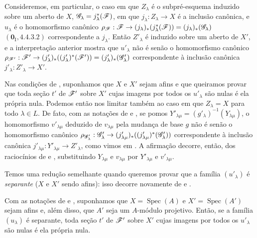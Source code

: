 \begin{env}[11.9.5]
Consideremos, em
particular, o caso em
que $Z_\lambda$ é o
subpré-esquema induzido
sobre um aberto de $X$,
$\mathscr{G}_\lambda=
j_\lambda^*(\mathscr{F})$,
em que $j_\lambda:
Z_\lambda\to X$ é a
inclusão canônica, e
$u_\lambda$ é o
homomorfismo canônico
$\rho_{\sh{F}}:
\sh{F}\to
(j_\lambda)_*
(j_\lambda^*(\sh{F}))
=(j_\lambda)_*
(\sh{G}_\lambda)$
$(\mathbf 0_{\mathrm I},
4.4.3.2)$ correspondente
a $j_\lambda$. Então
$Z'_\lambda$ é induzido
sobre um aberto de $X'$,
e a interpretação anterior
mostra que $u'_\lambda$
não é senão o
homomorfismo canônico
$\rho_{\sh{F}'}:
\sh{F}'\to
(j'_\lambda)_*
((j'_\lambda)^*
(\sh{F}'))
=(j'_\lambda)_*
(\sh{G}'_\lambda)$
correspondente à
inclusão canônica
$j'_\lambda:
Z'_\lambda\to X'$.
\end{env}

\begin{env}[11.9.6]
\label{IV.11.9.6}
Nas condições de
,
suponhamos que $X$ e
$X'$ sejam afins e que
queiramos provar que
toda seção $t'$ de
$\mathscr{F}'$ sobre $X'$
cujas imagens por todos
os $u'_\lambda$ são
nulas é ela própria
nula. Podemos então
nos limitar também ao
caso em que
$Z_\lambda=X$ para
todo $\lambda\in L$.
De fato, com as notações
de 
e ,
se pomos
$Y'_{\lambda\mu}
=(g'_\lambda)^{-1}
(Y_{\lambda\mu})$,
o homomorfismo
$v'_{\lambda\mu}$
deduzido de
$v_{\lambda\mu}$ pela
mudança de base $g$
não é senão o
homomorfismo canônico
$\rho_{\sh{G}'_\lambda}:
\sh{G}'_\lambda\to
(j'_{\lambda\mu})_*
((j'_{\lambda\mu})^*
(\sh{G}'_\lambda))$
correspondente à
inclusão canônica
$j'_{\lambda\mu}:
Y'_{\lambda\mu}\to
Z'_\lambda$, como vimos
em .
A afirmação decorre,
então, dos raciocínios
de 
e ,
substituindo
$Y_{\lambda\mu}$ e
$v_{\lambda\mu}$ por
$Y'_{\lambda\mu}$ e
$v'_{\lambda\mu}$.

Temos uma redução
semelhante quando
queremos provar que a
família $(u'_\lambda)$
é \emph{separante}
($X$ e $X'$ sendo
afins): isso decorre
novamente de
e .
\end{env}

\begin{proposition}[11.9.7]
\label{IV.11.9.7}
Com as notações de
 e
,
suponhamos que
$X=\operatorname{Spec}(A)$
e
$X'=\operatorname{Spec}(A')$
sejam afins e, além
disso, que $A'$ seja
um $A$-módulo projetivo.
Então, se a família
$(u_\lambda)$ é
separante, toda seção
$t'$ de $\mathscr{F}'$ sobre
$X'$ cujas imagens por
todos os $u'_\lambda$
são nulas é ela própria
nula.
\end{proposition}

